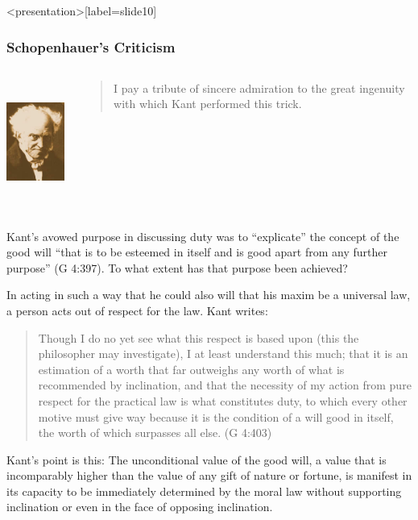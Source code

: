 \begin{frame}<presentation>[label=slide10]
    \frametitle{Schopenhauer's Criticism}
        \begin{columns}
            \begin{column}{3cm}
                \includegraphics[height=4cm]{../../../graphics/schopenhauer.jpg}
            \end{column}
            \begin{column}{7cm}
                \begin{quote}
                	I pay a tribute of sincere admiration to the great ingenuity with which Kant performed this trick.
                \end{quote}
            \end{column}
        \end{columns}
\end{frame}

Kant's avowed purpose in discussing duty was to ``explicate'' the concept of the good will ``that is to be esteemed in itself and is good apart from any further purpose'' (G 4:397). To what extent has that purpose been achieved?

In acting in such a way that he could also will that his maxim be a universal law, a person acts out of respect for the law. Kant writes:

\begin{quote}
	Though I do no yet see what this respect is based upon (this the philosopher may investigate), I at least understand this much; that it is an estimation of a worth that far outweighs any worth of what is recommended by inclination, and that the necessity of my action from pure respect for the practical law is what constitutes duty, to which every other motive must give way because it is the condition of a will good in itself, the worth of which surpasses all else. (G 4:403)
\end{quote}

Kant's point is this: The unconditional value of the good will, a value that is incomparably higher than the value of any gift of nature or fortune, is manifest in its capacity to be immediately determined by the moral law without supporting inclination or even in the face of opposing inclination.

